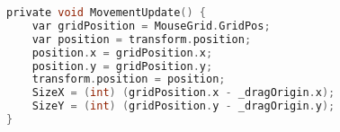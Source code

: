 \begin{lstlisting}[language={C},label=lst:movement_update,caption={Metoda \texttt{MovementUpdate} aktualizująca pozycję narzędzia przesuwania}]
private void MovementUpdate() {
    var gridPosition = MouseGrid.GridPos;
    var position = transform.position;
    position.x = gridPosition.x;
    position.y = gridPosition.y;
    transform.position = position;
    SizeX = (int) (gridPosition.x - _dragOrigin.x);
    SizeY = (int) (gridPosition.y - _dragOrigin.y);
}
\end{lstlisting}